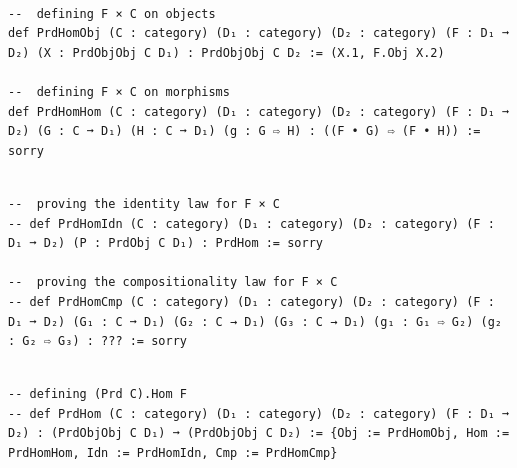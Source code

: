 \documentclass{book}
\newcounter{lcounter}
\begin{document}
\begin{center}
\begin{tcolorbox}[width=5in,colback={white},title={\begin{center}\texttt{Lean \thelcounter} \addtocounter{lcounter}{1}  \end{center}},colbacktitle=Blue,coltitle=black]
\begin{verbatim}

--  defining F × C on objects
def PrdHomObj (C : category) (D₁ : category) (D₂ : category) (F : D₁ ➞ D₂) (X : PrdObjObj C D₁) : PrdObjObj C D₂ := (X.1, F.Obj X.2)

--  defining F × C on morphisms
def PrdHomHom (C : category) (D₁ : category) (D₂ : category) (F : D₁ ➞ D₂) (G : C ➞ D₁) (H : C ➞ D₁) (g : G ⇨ H) : ((F • G) ⇨ (F • H)) := sorry

\end{verbatim}%
\end{tcolorbox}
\end{center}


\begin{center}
\begin{tcolorbox}[width=5in,colback={white},title={\begin{center}\texttt{Lean \thelcounter} \addtocounter{lcounter}{1}  \end{center}},colbacktitle=Blue,coltitle=black]
\begin{verbatim}

--  proving the identity law for F × C
-- def PrdHomIdn (C : category) (D₁ : category) (D₂ : category) (F : D₁ ➞ D₂) (P : PrdObj C D₁) : PrdHom := sorry 

--  proving the compositionality law for F × C
-- def PrdHomCmp (C : category) (D₁ : category) (D₂ : category) (F : D₁ ➞ D₂) (G₁ : C ➞ D₁) (G₂ : C → D₁) (G₃ : C → D₁) (g₁ : G₁ ⇨ G₂) (g₂ : G₂ ⇨ G₃) : ??? := sorry 

\end{verbatim}%
\end{tcolorbox}
\end{center}


\begin{center}
\begin{tcolorbox}[width=5in,colback={white},title={\begin{center}\texttt{Lean \thelcounter} \addtocounter{lcounter}{1}  \end{center}},colbacktitle=Blue,coltitle=black]
\begin{verbatim}

-- defining (Prd C).Hom F
-- def PrdHom (C : category) (D₁ : category) (D₂ : category) (F : D₁ ➞ D₂) : (PrdObjObj C D₁) ➞ (PrdObjObj C D₂) := {Obj := PrdHomObj, Hom := PrdHomHom, Idn := PrdHomIdn, Cmp := PrdHomCmp}

\end{verbatim}%
\end{tcolorbox}
\end{center}
\end{document}
